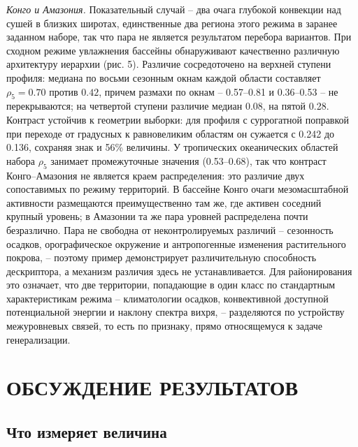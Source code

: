\documentclass[12pt,a4paper]{article}
\begin{document}
\emph{Конго и Амазония.} Показательный случай -- два очага глубокой конвекции над сушей в близких широтах, единственные два региона этого режима в заранее заданном наборе, так что пара не является результатом перебора вариантов. При сходном режиме увлажнения бассейны обнаруживают качественно различную архитектуру иерархии (рис. 5). Различие сосредоточено на верхней ступени профиля: медиана по восьми сезонным окнам каждой области составляет $\rho_5 = 0.70$ против $0.42$, причем размахи по окнам -- 0.57--0.81 и 0.36--0.53 -- не перекрываются; на четвертой ступени различие медиан 0.08, на пятой 0.28. Контраст устойчив к геометрии выборки: для профиля с суррогатной поправкой при переходе от градусных к равновеликим областям он сужается с 0.242 до 0.136, сохраняя знак и 56\% величины. У тропических океанических областей набора $\rho_5$ занимает промежуточные значения (0.53--0.68), так что контраст Конго--Амазония не является краем распределения: это различие двух сопоставимых по режиму территорий. В бассейне Конго очаги мезомасштабной активности размещаются преимущественно там же, где активен соседний крупный уровень; в Амазонии та же пара уровней распределена почти безразлично. Пара не свободна от неконтролируемых различий -- сезонность осадков, орографическое окружение и антропогенные изменения растительного покрова, -- поэтому пример демонстрирует различительную способность дескриптора, а механизм различия здесь не устанавливается. Для районирования это означает, что две территории, попадающие в один класс по стандартным характеристикам режима -- климатологии осадков, конвективной доступной потенциальной энергии и наклону спектра вихря, -- разделяются по устройству межуровневых связей, то есть по признаку, прямо относящемуся к задаче генерализации.

\section{ОБСУЖДЕНИЕ РЕЗУЛЬТАТОВ}

\subsection{Что измеряет величина}
\end{document}
